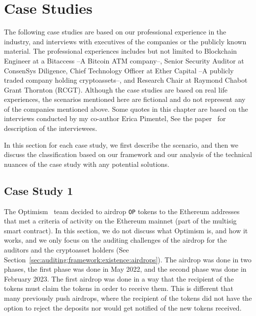 


\section{Case Studies} \label{sec:auditing:case-studies}

The following case studies are based on our professional experience in the industry, and interviews with executives of the companies or the publicly known material. The professional experiences includes but not limited to Blockchain Engineer at a Bitaccess --A Bitcoin ATM company--, Senior Security Auditor at ConsenSys Diligence, Chief Technology Officer at Ether Capital --A publicly traded company holding cryptoassets--, and Research Chair at Raymond Chabot Grant Thornton (RCGT). Although the case studies are based on real life experiences, the scenarios mentioned here are fictional and do not represent any of the companies mentioned above. Some quotes in this chapter are based on the interviews conducted by my co-author Erica Pimentel, See the paper~\cite{pimentel2021systemizing} for description of the interviewees.

In this section for each case study, we first describe the scenario, and then we discuss the classification based on our framework and our analysis of the technical nuances of the case study with any potential solutions.


\subsection{Case Study 1} \label{sec:auditing:case-studies:existence} %
The Optimism~\cite{optimismgithub} team decided to airdrop \texttt{OP} tokens to the Ethereum addresses that met a criteria of activity on the Ethereum mainnet (\eg part of the multisig smart contract). In this section, we do not discuss what Optimism is, and how it works, and we only focus on the auditing challenges of the airdrop for the auditors and the cryptoasset holders (See Section~\ref{sec:auditing:framework:existence:airdrops}). The airdrop was done in two phases, the first phase was done in May 2022, and the second phase was done in February 2023. The first airdrop was done in a way that the recipient of the tokens must claim the tokens in order to receive them. This is different that many previously push airdrops, where the recipient of the tokens did not have the option to reject the deposits nor would get notified of the new tokens received. 



